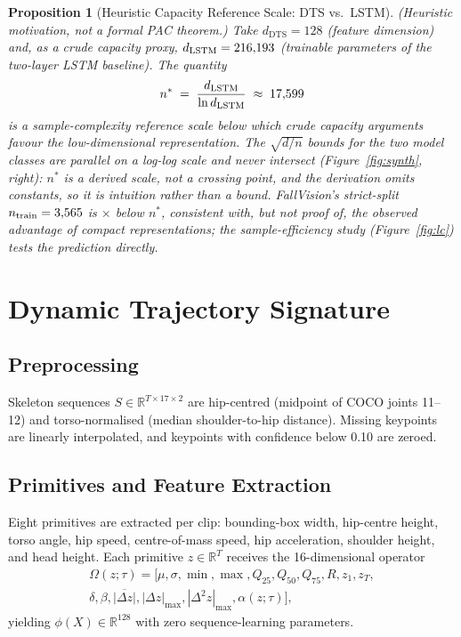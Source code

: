 \documentclass[letterpaper]{article}
\newtheorem{proposition}{Proposition}
\begin{document}
\begin{proposition}[Heuristic Capacity Reference Scale: DTS vs.\ LSTM]
(Heuristic motivation, not a formal PAC theorem.) Take $d_{\mathrm{DTS}} = 128$ (feature dimension) and, as a crude capacity proxy, $d_{\mathrm{LSTM}} = 216{,}193$ (trainable parameters of the two-layer LSTM baseline). The quantity
\begin{equation}
n^* \;=\; \frac{d_{\mathrm{LSTM}}}{\ln d_{\mathrm{LSTM}}} \;\approx\; 17{,}599
\label{eq:nstar}
\end{equation}
is a sample-complexity reference scale below which crude capacity arguments favour the low-dimensional representation. The $\sqrt{d/n}$ bounds for the two model classes are parallel on a log-log scale and never intersect (Figure~\ref{fig:synth}, right): $n^*$ is a derived scale, not a crossing point, and the derivation omits constants, so it is intuition rather than a bound. FallVision's strict-split $n_{\mathrm{train}} = 3{,}565$ is \nstarover$\times$ below $n^*$, consistent with, but not proof of, the observed advantage of compact representations; the sample-efficiency study (Figure~\ref{fig:lc}) tests the prediction directly.
\end{proposition}

\section{Dynamic Trajectory Signature}

\subsection{Preprocessing}
Skeleton sequences $S \in \mathbb{R}^{T \times 17 \times 2}$ are hip-centred (midpoint of COCO joints 11--12) and torso-normalised (median shoulder-to-hip distance). Missing keypoints are linearly interpolated, and keypoints with confidence below 0.10 are zeroed.

\subsection{Primitives and Feature Extraction}
Eight primitives are extracted per clip: bounding-box width, hip-centre height, torso angle, hip speed, centre-of-mass speed, hip acceleration, shoulder height, and head height. Each primitive $z \in \mathbb{R}^T$ receives the 16-dimensional operator
\begin{multline*}
\Omega(z;\tau) = [\mu, \sigma, \min, \max, Q_{25}, Q_{50}, Q_{75}, R, z_1, z_T,\\
\delta, \beta, \overline{|\Delta z|}, |\Delta z|_{\max}, |\Delta^2 z|_{\max}, \alpha(z;\tau)],
\end{multline*}
yielding $\phi(X) \in \mathbb{R}^{128}$ with zero sequence-learning parameters.
\end{document}
